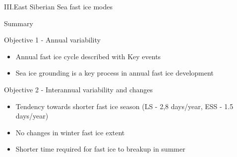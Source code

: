 \documentclass[8pt]{beamer}
\begin{document}
\begin{frame}[fragile]{III.East Siberian Sea fast ice modes}
\begin{center}

\end{center}
\end{frame}

\setwatermark{\fontsize{125pt}{125pt}\selectfont{}}
\begin{frame}{Summary}
	\begin{block}{Objective 1 -  Annual variability}
		\begin{itemize}
			\item Annual fast ice cycle described with Key events
			\item Sea ice grounding is a key process in annual fast ice development
		\end{itemize}
	\end{block}
	\begin{block}{Objective 2 - Interannual variability and changes}
		\begin{itemize}
			\item Tendency towards shorter fast ice season (LS - 2,8 days/year, ESS - 1.5 days/year)
			\item No changes in winter fast ice extent
			\item Shorter time required for fast ice to breakup in summer 
		\end{itemize}
	\end{block}
\end{frame}

\end{document}
